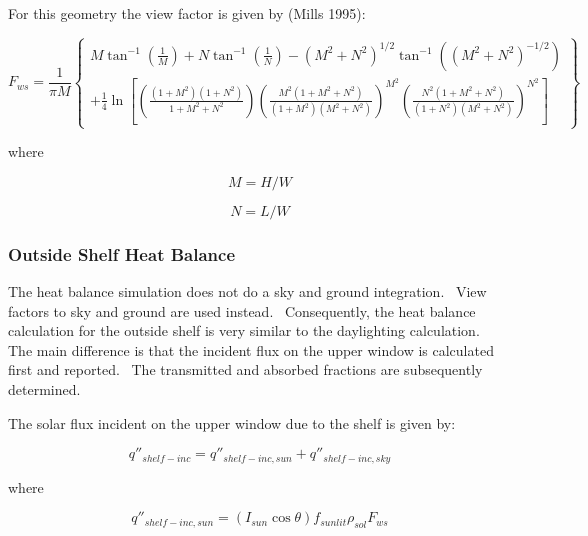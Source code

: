 For this geometry the view factor is given by (Mills 1995):

\begin{equation}
{F_{ws}} = \frac{1}{{\pi M}}\left\{ \begin{array}{l}M{\tan ^{ - 1}}\left( {\frac{1}{M}} \right) + N{\tan ^{ - 1}}\left( {\frac{1}{N}} \right) - {\left( {{M^2} + {N^2}} \right)^{1/2}}{\tan ^{ - 1}}\left( {{{\left( {{M^2} + {N^2}} \right)}^{ - 1/2}}} \right)\\ + \frac{1}{4}\ln \left[ {\left( {\frac{{\left( {1 + {M^2}} \right)\left( {1 + {N^2}} \right)}}{{1 + {M^2} + {N^2}}}} \right){{\left( {\frac{{{M^2}\left( {1 + {M^2} + {N^2}} \right)}}{{\left( {1 + {M^2}} \right)\left( {{M^2} + {N^2}} \right)}}} \right)}^{{M^2}}}{{\left( {\frac{{{N^2}\left( {1 + {M^2} + {N^2}} \right)}}{{\left( {1 + {N^2}} \right)\left( {{M^2} + {N^2}} \right)}}} \right)}^{{N^2}}}} \right]\end{array} \right\}
\end{equation}

where

\begin{equation}
M = H/W
\end{equation}

\begin{equation}
N = L/W
\end{equation}

\subsubsection{Outside Shelf Heat Balance}\label{outside-shelf-heat-balance}

The heat balance simulation does not do a sky and ground integration.~ View factors to sky and ground are used instead.~ Consequently, the heat balance calculation for the outside shelf is very similar to the daylighting calculation.~ The main difference is that the incident flux on the upper window is calculated first and reported.~ The transmitted and absorbed fractions are subsequently determined.

The solar flux incident on the upper window due to the shelf is given by:

\begin{equation}
{q''_{shelf - inc}} = {q''_{shelf - inc,sun}} + {q''_{shelf - inc,sky}}
\end{equation}

where

\begin{equation}
{q''_{shelf - inc,sun}} = \left( {{I_{sun}}\cos \theta } \right){f_{sunlit}}{\rho_{sol}}{F_{ws}}
\end{equation}


